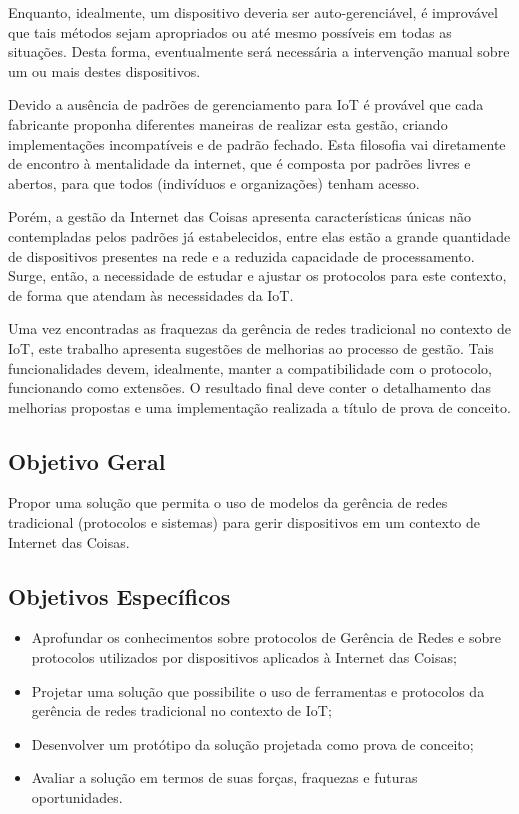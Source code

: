 \documentclass[twoside,english,brazilian]{UNISINOSmonografia}
\begin{document}
	Enquanto, idealmente, um 
	dispositivo deveria ser auto-gerenciável, é improvável que tais métodos 
	sejam apropriados ou até mesmo possíveis em todas as situações. Desta 
	forma, eventualmente será 
	necessária a intervenção manual sobre um ou mais destes dispositivos.

	Devido a ausência de padrões de gerenciamento para IoT é provável que cada 
	fabricante 
	proponha diferentes maneiras de realizar esta gestão, criando 
	implementações 
	incompatíveis e de padrão fechado. Esta filosofia vai diretamente 
	de encontro à mentalidade da internet, que é composta por padrões livres e 
	abertos,
	para que todos (indivíduos e organizações) tenham acesso.

	Porém, a gestão da Internet das Coisas apresenta características únicas 
	não contempladas pelos padrões já estabelecidos, entre elas estão a grande 
	quantidade de dispositivos presentes na rede e a reduzida capacidade de 
	processamento. Surge, então, a necessidade de estudar e ajustar os 
	protocolos para este contexto, de forma que atendam às necessidades da IoT.

	Uma vez encontradas as fraquezas da gerência de redes tradicional no 
	contexto de IoT, este trabalho apresenta sugestões de melhorias ao 
	processo de gestão.
	Tais funcionalidades devem, idealmente, manter a compatibilidade com o 
	protocolo, funcionando como extensões. 
	O resultado final deve conter o detalhamento das melhorias propostas e uma 
	implementação realizada a título de prova de conceito.

\subsection{Objetivo Geral}

Propor uma solução que permita o uso de modelos da gerência de 
redes tradicional (protocolos e sistemas) para gerir dispositivos em um 
contexto de Internet das Coisas.

\subsection{Objetivos Específicos}

	\begin{itemize}
		\item 
		Aprofundar os conhecimentos sobre protocolos de Gerência de 
		Redes e sobre protocolos utilizados por dispositivos aplicados 
		à Internet das Coisas;
		
		\item
		Projetar uma solução que possibilite o uso de ferramentas e protocolos 
		da gerência de redes tradicional no contexto de IoT;
		
		\item
		Desenvolver um protótipo da solução projetada como prova de conceito;

		\item
		Avaliar a solução em termos de suas forças, fraquezas e futuras 
		oportunidades.
		
	\end{itemize}
\end{document}
